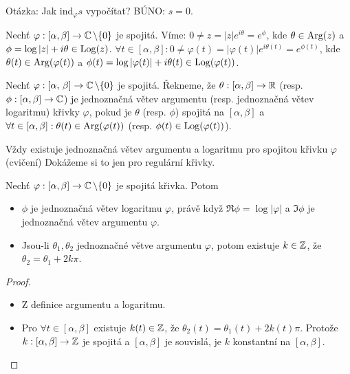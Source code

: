 \begin{note}
Otázka: Jak ind$_\varphi s$ vypočítat? BÚNO: $s=0$.
\end{note}

\begin{notation}
Nechť $\varphi: [\alpha, \beta] \rightarrow \operatorname{\mathbb{C}}  \setminus \{0\}$ je spojitá. Víme: $0 \neq z = |z|e^{i \theta}=e^{\phi}$, kde $\theta \in \operatorname*{Arg}(z)$ a $\phi = \log|z| + i \theta \in \operatorname*{Log}(z)$. $\forall t \in [\alpha, \beta]: 0 \neq \varphi(t)=|\varphi(t)|e^{i \theta(t)}=e^{ \phi(t)}$, kde $\theta(t) \in \operatorname*{Arg}(\varphi(t))$ a $\phi(t)=\log|\varphi(t)|+i \theta(t) \in \operatorname*{Log}(\varphi(t))$.
\end{notation}

\begin{definition}
Nechť $\varphi: [\alpha,\,\beta] \rightarrow \operatorname{\mathbb{C}}  \setminus \{0\}$ je spojitá. Řekneme, že $\theta: [\alpha, \beta] \rightarrow \operatorname{\mathbb{R}}$ (resp. $\phi: [\alpha, \beta] \rightarrow \operatorname{\mathbb{C}} $) je jednoznačná větev argumentu (resp. jednoznačná větev logaritmu) křivky $\varphi$, pokud je $\theta$ (resp. $\phi$) spojitá na $[\alpha, \beta]$ a $\forall t \in [\alpha, \beta]:  \theta(t) \in \operatorname*{Arg}(\varphi(t))$ (resp. $\phi(t) \in \operatorname*{Log}(\varphi(t))$).
\end{definition}

\begin{note}
Vždy existuje jednoznačná větev argumentu a logaritmu pro spojitou křivku $\varphi$ (cvičení) Dokážeme si to jen pro regulární křivky.
\end{note}

\begin{theorem}
Nechť $\varphi: [\alpha, \beta] \rightarrow \operatorname{\mathbb{C}}  \setminus \{0\}$ je spojitá křivka. Potom
\begin{itemize}
    \item $\phi$ je jednoznačná větev logaritmu $\varphi$, právě když $\Re \phi = \log|\varphi|$ a $\Im \phi$ je jednoznačná větev argumentu $\varphi$.
    \item Jsou-li $\theta_1, \theta_2$ jednoznačné větve argumentu $\varphi$, potom existuje $k \in \operatorname{\mathbb{Z}}$, že $\theta_2=\theta_1 + 2 k \pi $.
\end{itemize}
\end{theorem}

\begin{proof}
\begin{itemize}
    \item Z definice argumentu a logaritmu.
    \item Pro $\forall t \in [\alpha, \beta]$ existuje $k (t) \in \operatorname{\mathbb{Z}}$, že $\theta_2(t)=\theta_1(t) + 2 k(t) \pi$. Protože $k:  [\alpha, \beta] \rightarrow \operatorname{\mathbb{Z}}$ je spojitá a $[\alpha, \beta]$ je souvislá, je $k$ konstantní na $[\alpha, \beta]$.
\end{itemize}
\end{proof}

